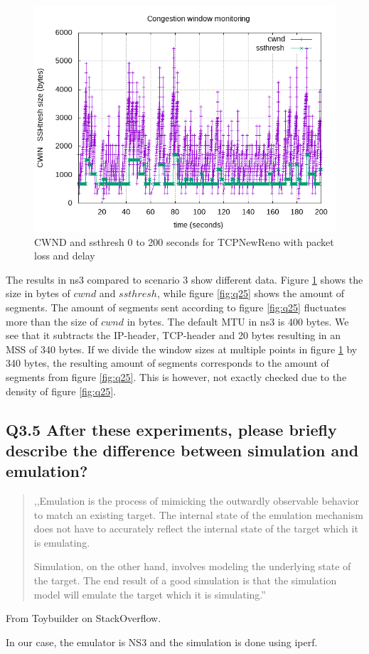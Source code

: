 \documentclass{article}
\begin{document}
\begin{figure}[H]
	\includegraphics{lab1-group1-task3-question4.png}
	\caption{CWND and ssthresh 0 to 200 seconds for TCPNewReno with packet loss and delay}
	\label{fig:q34}
\end{figure}

The results in ns3 compared to scenario 3 show different data. Figure \ref{fig:q34} shows the size in bytes of $cwnd$ and $ssthresh$, while figure \ref{fig:q25}
shows the amount of segments. The amount of segments sent according to figure \ref{fig:q25} fluctuates more than the size of $cwnd$ in bytes. The default MTU in ns3 is 400 bytes.
We see that it subtracts the IP-header, TCP-header and 20 bytes resulting in an MSS of 340 bytes. If we divide the window sizes at multiple points in figure \ref{fig:q34} by
340 bytes, the resulting amount of segments corresponds to the amount of segments from figure \ref{fig:q25}. This is however, not exactly checked due to the density of figure \ref{fig:q25}.


\subsection{Q3.5 After these experiments, please briefly describe the difference between simulation and emulation?}

\begin{quote}
,,Emulation is the process of mimicking the outwardly observable behavior to
match an existing target. The internal state of the emulation mechanism does
not have to accurately reflect the internal state of the target which it is
emulating.

Simulation, on the other hand, involves modeling the underlying state of the
target. The end result of a good simulation is that the simulation model will
emulate the target which it is simulating.''
\end{quote}

From Toybuilder on StackOverflow\cite{toybuilder}.

In our case, the emulator is NS3 and the simulation is done using iperf.


\printbibliography
\end{document}
